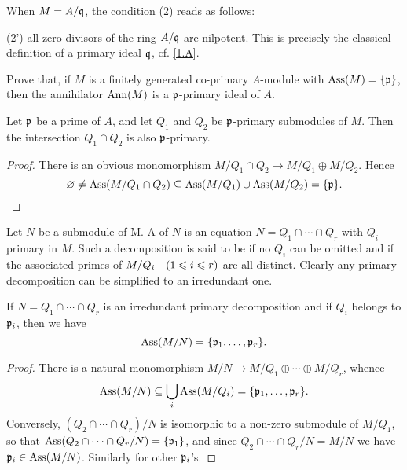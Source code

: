 \documentclass[../main]{subfiles}
\begin{document}
\begin{remark}
When $M = A/\mathfrak{q}$, the condition (2) reads as follows:

(2') all zero-divisors of the ring $A/\mathfrak{q}$ are nilpotent. 
This is precisely the classical definition of a primary ideal $\mathfrak{q}$, cf. \ref{1.A}.
\end{remark} 

\begin{exercise}
Prove that, if $M$ is a finitely generated co-primary $A$-module with $\operatorname{Ass}(M) = \{\mathfrak{p}\}$, then the annihilator $\operatorname{Ann}(M)$ is a $\mathfrak{p}$-primary ideal of $A$.
\end{exercise}

\newparagraph Let $\mathfrak{p}$ be a prime of $A$, and let $Q_1$ and $Q_2$ be $\mathfrak{p}$-primary submodules of $M$. Then the intersection $Q_1\cap Q_2$ is also $\mathfrak{p}$-primary.

\begin{proof}
There is an obvious monomorphism $M/Q_1\cap Q_2\longrightarrow M/Q_1\oplus M/Q_2$. Hence \[\varnothing\neq\operatorname{Ass}(M/Q_1\cap Q_2)\subseteq\operatorname{Ass}(M/Q_1)\cup\operatorname{Ass}(M/Q_2)=\{\mathfrak{p}\}.\]
\end{proof}

\newparagraph Let $N$ be a submodule of M. A  of $N$ is an equation $N = Q_1\cap\cdots\cap Q_r$ with $Q_i$ primary in $M$. Such a decomposition is said to be  if no $Q_i$ can be omitted and if the associated primes of $M/Q_i\for{1\leqslant i\leqslant r}$ are all distinct. Clearly any primary decomposition can be simplified to an irredundant one. 

\begin{parlemma}\label{lem:08.01}
If $N=Q_1\cap\cdots\cap Q_r$ is an irredundant primary decomposition and if $Q_i$ belongs to $\mathfrak{p}_i$, then we have \[\operatorname{Ass}(M/N)=\{\mathfrak{p}_1,\dots,\mathfrak{p}_r\}.\]
\end{parlemma}

\begin{proof}
There is a natural monomorphism $M/N\longrightarrow M/Q_1\oplus\cdots\oplus M/Q_r$, whence \[\operatorname{Ass}(M/N)\subseteq\bigcup_i\operatorname{Ass}(M/Q_i)=\{\mathfrak{p}_1,\dots,\mathfrak{p}_r\}.\] Conversely, $(Q_2\cap\cdots\cap Q_r)/N$ is isomorphic to a non-zero submodule of $M/Q_1$, so that $\operatorname{Ass}(Q_2\cap\cdots\cap Q_r/N)=\{\mathfrak{p}_1\}$, and since $Q_2\cap\cdots\cap Q_r/N=M/N$ we have $\mathfrak{p}_i\in\operatorname{Ass}(M/N)$. Similarly for other $\mathfrak{p}_i$'s.
\end{proof}
\end{document}
